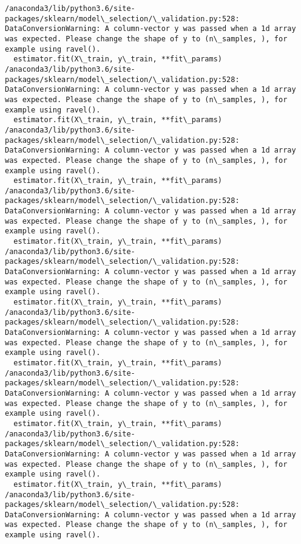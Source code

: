 \documentclass[11pt]{article}
\begin{document}
    \begin{Verbatim}[commandchars=\\\{\}]
/anaconda3/lib/python3.6/site-packages/sklearn/model\_selection/\_validation.py:528: DataConversionWarning: A column-vector y was passed when a 1d array was expected. Please change the shape of y to (n\_samples, ), for example using ravel().
  estimator.fit(X\_train, y\_train, **fit\_params)
/anaconda3/lib/python3.6/site-packages/sklearn/model\_selection/\_validation.py:528: DataConversionWarning: A column-vector y was passed when a 1d array was expected. Please change the shape of y to (n\_samples, ), for example using ravel().
  estimator.fit(X\_train, y\_train, **fit\_params)
/anaconda3/lib/python3.6/site-packages/sklearn/model\_selection/\_validation.py:528: DataConversionWarning: A column-vector y was passed when a 1d array was expected. Please change the shape of y to (n\_samples, ), for example using ravel().
  estimator.fit(X\_train, y\_train, **fit\_params)
/anaconda3/lib/python3.6/site-packages/sklearn/model\_selection/\_validation.py:528: DataConversionWarning: A column-vector y was passed when a 1d array was expected. Please change the shape of y to (n\_samples, ), for example using ravel().
  estimator.fit(X\_train, y\_train, **fit\_params)
/anaconda3/lib/python3.6/site-packages/sklearn/model\_selection/\_validation.py:528: DataConversionWarning: A column-vector y was passed when a 1d array was expected. Please change the shape of y to (n\_samples, ), for example using ravel().
  estimator.fit(X\_train, y\_train, **fit\_params)
/anaconda3/lib/python3.6/site-packages/sklearn/model\_selection/\_validation.py:528: DataConversionWarning: A column-vector y was passed when a 1d array was expected. Please change the shape of y to (n\_samples, ), for example using ravel().
  estimator.fit(X\_train, y\_train, **fit\_params)
/anaconda3/lib/python3.6/site-packages/sklearn/model\_selection/\_validation.py:528: DataConversionWarning: A column-vector y was passed when a 1d array was expected. Please change the shape of y to (n\_samples, ), for example using ravel().
  estimator.fit(X\_train, y\_train, **fit\_params)
/anaconda3/lib/python3.6/site-packages/sklearn/model\_selection/\_validation.py:528: DataConversionWarning: A column-vector y was passed when a 1d array was expected. Please change the shape of y to (n\_samples, ), for example using ravel().
  estimator.fit(X\_train, y\_train, **fit\_params)
/anaconda3/lib/python3.6/site-packages/sklearn/model\_selection/\_validation.py:528: DataConversionWarning: A column-vector y was passed when a 1d array was expected. Please change the shape of y to (n\_samples, ), for example using ravel().

\end{Verbatim}
\end{document}
